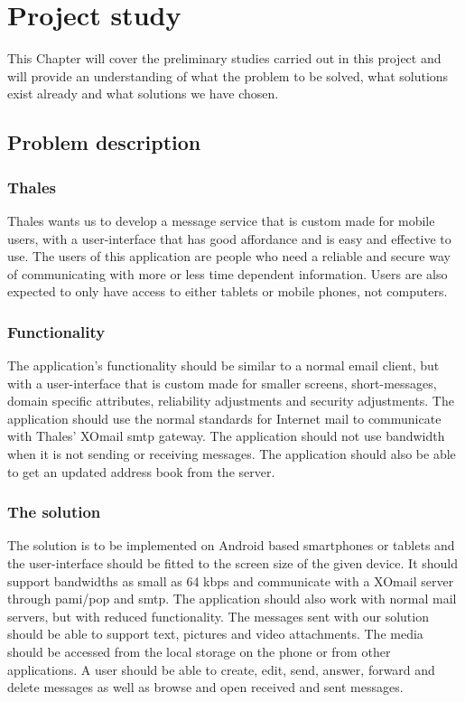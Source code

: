 \chapter{Project study}

This Chapter will cover the preliminary studies carried out in this project and will provide an understanding of what the problem to be solved, what solutions exist already and what solutions we have chosen.

\section{Problem description}

\subsection{Thales}
Thales wants us to develop a message service that is custom made for mobile users, with a user-interface that has good affordance and is easy and effective to use.
\newline
\newline
The users of this application are people who need a reliable and secure way of communicating with more or less time dependent information. Users are also expected to only have access to either tablets or mobile phones, not computers.

\subsection{Functionality}
The application’s functionality should be similar to a normal email client, but with a user-interface that is custom made for smaller screens, short-messages, domain specific attributes, reliability adjustments and security adjustments. The application should use the normal standards for Internet mail to communicate with Thales’ XOmail \gls{smtp} gateway.
\newline
\newline
The application should not use bandwidth when it is not sending or receiving messages. The application should also be able to get an updated address book from the server.

\subsection{The solution}
The solution is to be implemented on Android based smartphones or tablets and the user-interface should be fitted to the screen size of the given device. It should support bandwidths as small as 64 kbps and communicate with a XOmail
server through \gls{pami}/\gls{pop} and \gls{smtp}. The application should also work with normal mail servers, but with reduced functionality.
\newline
\newline
The messages sent with our solution should be able to support text, pictures and video attachments. The media should be accessed from the local storage on the phone or from other applications. A user should be able to create, edit, send, answer, forward and delete messages as well as browse and open received and sent messages.

